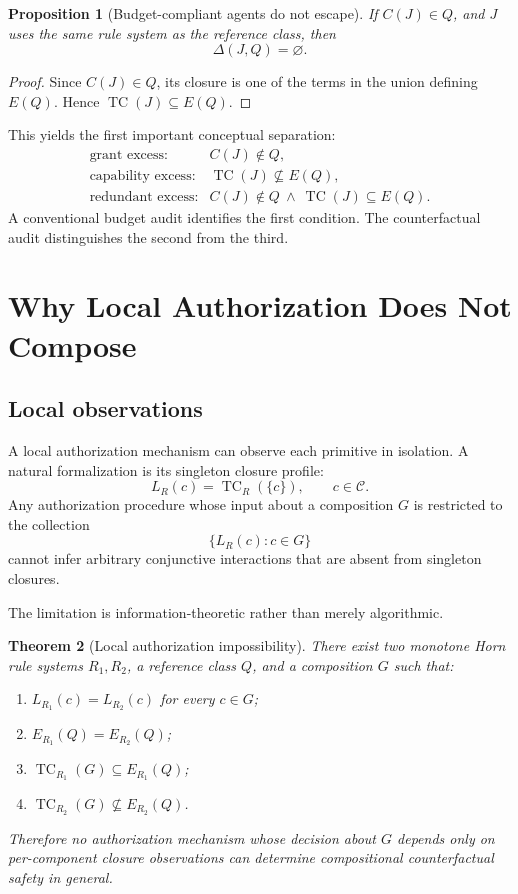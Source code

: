 \documentclass[11pt]{article}
\newtheorem{theorem}{Theorem}[section]
\newtheorem{proposition}[theorem]{Proposition}
\newcommand{\TC}{\operatorname{TC}}
\newcommand{\Cset}{\mathcal C}
\begin{document}
\begin{proposition}[Budget-compliant agents do not escape]
If $C(J)\in Q$, and $J$ uses the same rule system as the reference class, then
\[
\Delta(J,Q)=\varnothing.
\]
\end{proposition}

\begin{proof}
Since $C(J)\in Q$, its closure is one of the terms in the union defining $E(Q)$. Hence $\TC(J)\subseteq E(Q)$.
\end{proof}

This yields the first important conceptual separation:
\[
\begin{array}{ll}
\text{grant excess:}&C(J)\notin Q,\\[2pt]
\text{capability excess:}&\TC(J)\not\subseteq E(Q),\\[2pt]
\text{redundant excess:}&C(J)\notin Q\ \land\ \TC(J)\subseteq E(Q).
\end{array}
\]
A conventional budget audit identifies the first condition. The counterfactual audit distinguishes the second from the third.

\section{Why Local Authorization Does Not Compose}

\subsection{Local observations}

A local authorization mechanism can observe each primitive in isolation. A natural formalization is its singleton closure profile:
\[
L_R(c)=\TC_R(\{c\}),\qquad c\in\Cset.
\]
Any authorization procedure whose input about a composition $G$ is restricted to the collection
\[
\{L_R(c):c\in G\}
\]
cannot infer arbitrary conjunctive interactions that are absent from singleton closures.

The limitation is information-theoretic rather than merely algorithmic.

\begin{theorem}[Local authorization impossibility]
There exist two monotone Horn rule systems $R_1,R_2$, a reference class $Q$, and a composition $G$ such that:
\begin{enumerate}[label=(\roman*)]
\item $L_{R_1}(c)=L_{R_2}(c)$ for every $c\in G$;
\item $E_{R_1}(Q)=E_{R_2}(Q)$;
\item $\TC_{R_1}(G)\subseteq E_{R_1}(Q)$;
\item $\TC_{R_2}(G)\not\subseteq E_{R_2}(Q)$.
\end{enumerate}
Therefore no authorization mechanism whose decision about $G$ depends only on per-component closure observations can determine compositional counterfactual safety in general.
\end{theorem}
\end{document}

